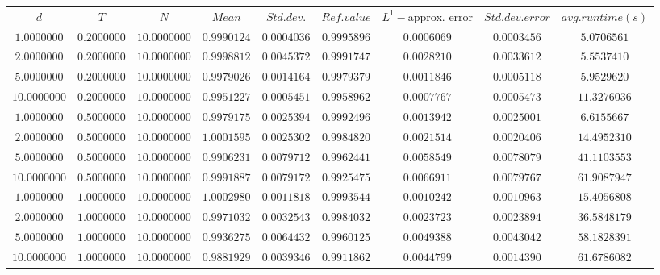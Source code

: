 \begin{tabular}{ccccccccc}
$d$ & $T$ & $N$ & $Mean$ & $Std. dev.$ & $Ref. value$ & $L^1-$approx. error & $Std. dev. error$ & $avg. runtime (s)$\\
$1.0000000$ & $0.2000000$ & $10.0000000$ & $0.9990124$ & $0.0004036$ & $0.9995896$ & $0.0006069$ & $0.0003456$ & $5.0706561$\\
$2.0000000$ & $0.2000000$ & $10.0000000$ & $0.9998812$ & $0.0045372$ & $0.9991747$ & $0.0028210$ & $0.0033612$ & $5.5537410$\\
$5.0000000$ & $0.2000000$ & $10.0000000$ & $0.9979026$ & $0.0014164$ & $0.9979379$ & $0.0011846$ & $0.0005118$ & $5.9529620$\\
$10.0000000$ & $0.2000000$ & $10.0000000$ & $0.9951227$ & $0.0005451$ & $0.9958962$ & $0.0007767$ & $0.0005473$ & $11.3276036$\\
$1.0000000$ & $0.5000000$ & $10.0000000$ & $0.9979175$ & $0.0025394$ & $0.9992496$ & $0.0013942$ & $0.0025001$ & $6.6155667$\\
$2.0000000$ & $0.5000000$ & $10.0000000$ & $1.0001595$ & $0.0025302$ & $0.9984820$ & $0.0021514$ & $0.0020406$ & $14.4952310$\\
$5.0000000$ & $0.5000000$ & $10.0000000$ & $0.9906231$ & $0.0079712$ & $0.9962441$ & $0.0058549$ & $0.0078079$ & $41.1103553$\\
$10.0000000$ & $0.5000000$ & $10.0000000$ & $0.9991887$ & $0.0079172$ & $0.9925475$ & $0.0066911$ & $0.0079767$ & $61.9087947$\\
$1.0000000$ & $1.0000000$ & $10.0000000$ & $1.0002980$ & $0.0011818$ & $0.9993544$ & $0.0010242$ & $0.0010963$ & $15.4056808$\\
$2.0000000$ & $1.0000000$ & $10.0000000$ & $0.9971032$ & $0.0032543$ & $0.9984032$ & $0.0023723$ & $0.0023894$ & $36.5848179$\\
$5.0000000$ & $1.0000000$ & $10.0000000$ & $0.9936275$ & $0.0064432$ & $0.9960125$ & $0.0049388$ & $0.0043042$ & $58.1828391$\\
$10.0000000$ & $1.0000000$ & $10.0000000$ & $0.9881929$ & $0.0039346$ & $0.9911862$ & $0.0044799$ & $0.0014390$ & $61.6786082$\\
\end{tabular}

